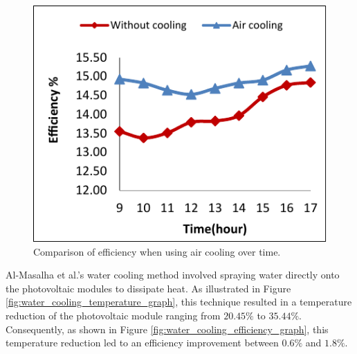 \begin{figure}[ht]
\begin{minipage}[b]{0.45\linewidth}
        \includegraphics[width=\linewidth]{Figures/air_cooling_efficiency_graph.pdf}
        \caption{Comparison of efficiency when using air cooling over time. \cite{Al-Masalha2024ImprovingSystems}}
        \label{fig:air_cooling_efficiency_graph}
    \end{minipage}
\end{figure}

Al-Masalha et al.'s water cooling method involved spraying water directly onto the photovoltaic modules to dissipate heat. As illustrated in Figure \ref{fig:water_cooling_temperature_graph}, this technique resulted in a temperature reduction of the photovoltaic module ranging from $20.45\%$ to $35.44\%$. Consequently, as shown in Figure \ref{fig:water_cooling_efficiency_graph}, this temperature reduction led to an efficiency improvement between $0.6\%$ and $1.8\%$. \cite{Al-Masalha2024ImprovingSystems}

